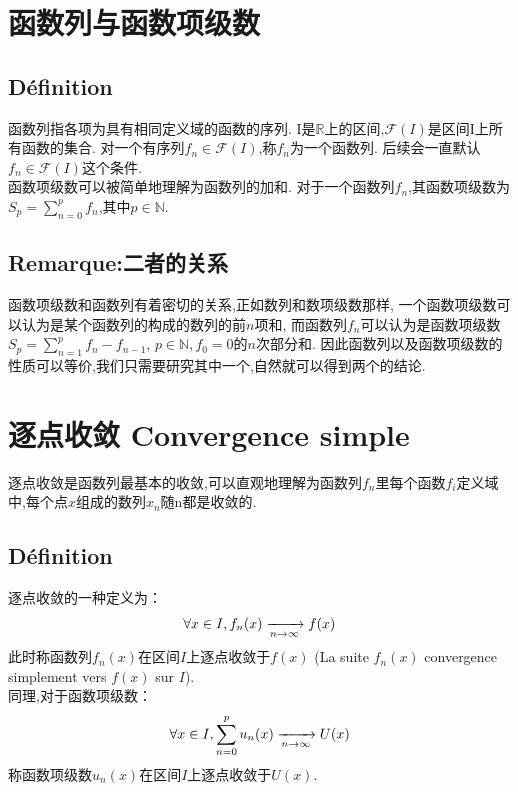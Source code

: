 \documentclass[12pt, a4paper, oneside]{ctexbook}
\newcommand{\R }{\mathbb{R}}%
\newcommand{\n }{$n$}\newcommand{\f  }{$ f $}
\begin{document}
\section{函数列与函数项级数}
  \subsection{Définition}
  函数列指各项为具有相同定义域的函数的序列.
  I是$\R$上的区间,$\mathcal{F}(I)$是区间I上所有函数的集合.
  对一个有序列${f_n}\in\mathcal{F}(I)$,称${f_n}$为一个函数列.
  后续会一直默认${f_n}\in\mathcal{F}(I)$这个条件.\\

  函数项级数可以被简单地理解为函数列的加和.
  对于一个函数列${f_n}$,其函数项级数为$S_p=\sum_{n=0}^{p} f_n$,其中$p\in\mathbb{N}$.\\
  \subsection{Remarque:二者的关系}
  函数项级数和函数列有着密切的关系,正如数列和数项级数那样,
  一个函数项级数可以认为是某个函数列的构成的数列的前\n 项和,
  而函数列${f_n}$可以认为是函数项级数$S_p=\sum_{n=1}^{p} f_n-f_{n-1}$, $p\in\mathbb{N}, f_0=0$的\n 次部分和.
  因此函数列以及函数项级数的性质可以等价,我们只需要研究其中一个,自然就可以得到两个的结论.


\section{逐点收敛 Convergence simple}
  逐点收敛是函数列最基本的收敛,可以直观地理解为函数列${f_n}$里每个函数$f_i$定义域中,每个点$x$组成的数列${x}_n$随n都是收敛的.
  \subsection{Définition}
  逐点收敛的一种定义为：
  \begin{equation}
    \notag
    \forall x\in I, f_n(x)\xrightarrow[n\rightarrow\infty]{}f(x)
  \end{equation}
  此时称函数列$f_n(x)$在区间$I$上逐点收敛于$f(x)$ (La suite $f_n(x)$ convergence simplement vers $f(x)$ sur $I$).\\
  同理,对于函数项级数：
  \begin{equation}
    \notag
    \forall x\in I, \sum_{n=0}^{p} u_n(x)\xrightarrow[n\rightarrow\infty]{}U(x)
  \end{equation}
  称函数项级数$u_n(x)$在区间$I$上逐点收敛于$U(x)$.
  
\end{document}
